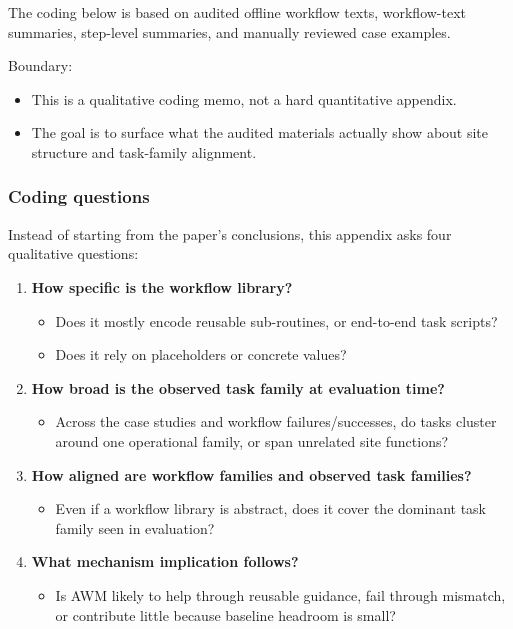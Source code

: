 The coding below is based on audited offline workflow texts,
workflow-text summaries, step-level summaries, and manually reviewed
case examples.

Boundary:

\begin{itemize}
\tightlist
\item
  This is a qualitative coding memo, not a hard quantitative appendix.
\item
  The goal is to surface what the audited materials actually show about
  site structure and task-family alignment.
\end{itemize}

\subsubsection{Coding questions}

Instead of starting from the paper's conclusions, this appendix asks
four qualitative questions:

\begin{enumerate}
\def\labelenumi{\arabic{enumi}.}
\item
  \textbf{How specific is the workflow library?}

  \begin{itemize}
  \tightlist
  \item
    Does it mostly encode reusable sub-routines, or end-to-end task
    scripts?
  \item
    Does it rely on placeholders or concrete values?
  \end{itemize}
\item
  \textbf{How broad is the observed task family at evaluation time?}

  \begin{itemize}
  \tightlist
  \item
    Across the case studies and workflow failures/successes, do tasks
    cluster around one operational family, or span unrelated site
    functions?
  \end{itemize}
\item
  \textbf{How aligned are workflow families and observed task families?}

  \begin{itemize}
  \tightlist
  \item
    Even if a workflow library is abstract, does it cover the dominant
    task family seen in evaluation?
  \end{itemize}
\item
  \textbf{What mechanism implication follows?}

  \begin{itemize}
  \tightlist
  \item
    Is AWM likely to help through reusable guidance, fail through
    mismatch, or contribute little because baseline headroom is small?
  \end{itemize}
\end{enumerate}

